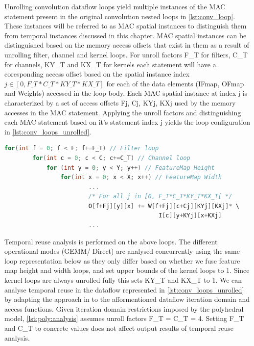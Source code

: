 Unrolling convolution dataflow loops yield multiple instances of the \ac{MAC}
statement present in the original convolution nested loops in
\autoref{lst:conv_loop}. These instances will be referred to as \ac{MAC} spatial
instances to distinguish them from temporal instances discussed in this chapter.
\ac{MAC} spatial instances can be distinguished based on the memory access
offsets that exist in them as a result of unrolling filter, channel and kernel
loops. For unroll factors F\_T for filters, C\_T for channels, KY\_T and KX\_T
for kernels each statement will have a coresponding access offset based on the
spatial instance index $j \in [0, F\_T*C\_T*KY\_T*KX\_T]$ for each of the data
elements (IFmap, OFmap and Weights) accessed in the loop body. Each \ac{MAC}
spatial instance at index j is characterized by a set of access offsets {Fj, Cj,
KYj, KXj} used by the memory accesses in the \ac{MAC} statement. Applying the
unroll factors and distinguishing each \ac{MAC} statement based on it's
statement index j yields the loop configuration in
\autoref{lst:conv_loops_unrolled}. 

\begin{lstlisting}[language=C, caption=Fully unrolled convolution dataflow loops, label={lst:conv_loops_unrolled}]
    for(int f = 0; f < F; f+=F_T) // Filter loop
        for(int c = 0; c < C; c+=C_T) // Channel loop
            for (int y = 0; y < Y; y++) // FeatureMap Height
                for(int x = 0; x < X; x++) // FeatureMap Width
                        ...
                        /* For all j in [0, F_T*C_T*KY_T*KX_T[ */ 
                        O[f+Fj][y][x] += W[f+Fj][c+Cj][KYj][KXj]* \
                                            I[c][y+KYj][x+KXj] 
                        ...
\end{lstlisting}

Temporal reuse analysis is performed on the above loops. The different
operational modes (GEMM/ Direct) are analysed concurrently using the same loop
representation below as they only differ based on whether we fuse feature map
height and width loops, and set upper bounds of the kernel loops to 1. Since
kernel loops are always unrolled fully this sets KY\_T and KX\_T to 1. We can
analyse temporal reuse in the dataflow represented in
\autoref{lst:conv_loops_unrolled} by adapting the approach in \cite{meeus} 
to the afformentioned dataflow iteration domain and access functions.
Given iteration domain restrictions imposed by the polyhedral model,
\autoref{lst:poly:analysis} assumes unroll factors F\_T =
C\_T = 4. Setting F\_T and C\_T to concrete values does not affect output
results of temporal reuse analysis.

